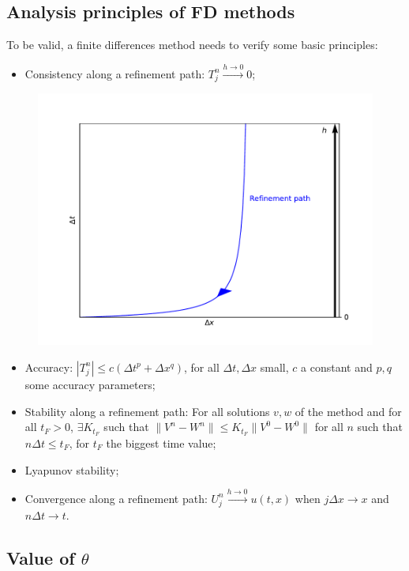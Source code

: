 \documentclass[12pt, openany]{report}
\theoremstyle{definition}
\begin{document}
\subsection{Analysis principles of FD methods}
To be valid, a finite differences method needs to verify some basic principles:
\begin{itemize}
	\item Consistency along a refinement path: $T_j^n \xrightarrow{h\rightarrow 0} 0$;
\end{itemize}
\begin{figure}[H]
	\centering
	\includegraphics[width=.6\textwidth]{img/refinement.pdf}
\end{figure}
\begin{itemize}
	\item Accuracy: $|T_j^n| \le c (\Delta t^p + \Delta x^q)$, for all $\Delta t, \Delta x$ small, $c$ a constant and $p,q$ some accuracy parameters;
	\item Stability along a refinement path: For all solutions $v,w$ of the method and for all $t_F>0$, $\exists K_{t_F}$ such that $\| V^n - W^n \|\le K_{t_F} \|V^0 - W^0\|$ for all $n$ such that $n\Delta t\le t_F$, for $t_F$ the biggest time value;
	\item Lyapunov stability;
	\item Convergence along a refinement path: $U_j^n \xrightarrow{h\rightarrow 0}u(t,x)$ when $j\Delta x \rightarrow x$ and $n\Delta t \rightarrow t$. 
\end{itemize} 
\subsection{Value of $\theta$}
\end{document}
